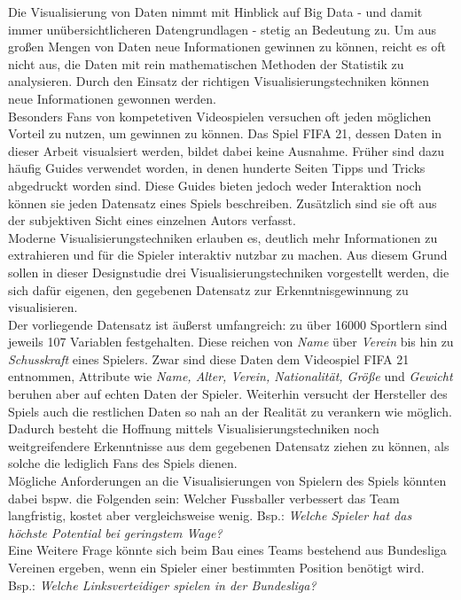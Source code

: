 \documentclass[usegeometry=true]{scrartcl}
\begin{document}
Die Visualisierung von Daten nimmt mit Hinblick auf Big Data - und damit immer unübersichtlicheren Datengrundlagen - stetig an Bedeutung zu. Um aus großen Mengen von Daten neue Informationen gewinnen zu können, reicht es oft nicht aus, die Daten mit rein mathematischen Methoden der Statistik zu analysieren. Durch den Einsatz der richtigen Visualisierungstechniken können neue Informationen gewonnen werden.\\
Besonders Fans von kompetetiven Videospielen versuchen oft jeden möglichen Vorteil zu nutzen, um gewinnen zu können.
Das Spiel FIFA 21, dessen Daten in dieser Arbeit visualsiert werden, bildet dabei keine Ausnahme.
Früher sind dazu häufig Guides verwendet worden, in denen hunderte Seiten Tipps und Tricks abgedruckt worden sind. Diese Guides bieten jedoch weder Interaktion noch können sie jeden Datensatz eines Spiels beschreiben. Zusätzlich sind sie oft aus der subjektiven Sicht eines einzelnen Autors verfasst.\\
Moderne Visualisierungstechniken erlauben es, deutlich mehr Informationen zu extrahieren und für die Spieler interaktiv nutzbar zu machen.
Aus diesem Grund sollen in dieser Designstudie drei Visualisierungstechniken vorgestellt werden, die sich dafür eigenen, den gegebenen Datensatz zur Erkenntnisgewinnung zu visualisieren.\\
Der vorliegende Datensatz ist äußerst umfangreich: zu über 16000 Sportlern sind jeweils 107 Variablen festgehalten. Diese reichen von \textit{Name} über \textit{Verein} bis hin zu \textit{Schusskraft} eines Spielers.
Zwar sind diese Daten dem Videospiel FIFA 21 entnommen, Attribute wie \textit{Name, Alter, Verein, Nationalität, Größe} und \textit{Gewicht} beruhen aber auf echten Daten der Spieler. Weiterhin versucht der Hersteller des Spiels auch die restlichen Daten so nah an der Realität zu verankern wie möglich.
Dadurch besteht die Hoffnung mittels Visualisierungstechniken noch weitgreifendere Erkenntnisse aus dem gegebenen Datensatz ziehen zu können, als solche die lediglich Fans des Spiels dienen.\\
Mögliche Anforderungen an die Visualisierungen von Spielern des Spiels könnten dabei bspw. die Folgenden sein: Welcher Fussballer verbessert das Team langfristig, kostet aber vergleichsweise wenig. Bsp.: \textit{Welche Spieler hat das höchste Potential bei geringstem Wage?}\\
Eine Weitere Frage könnte sich beim Bau eines Teams bestehend aus Bundesliga Vereinen ergeben, wenn ein Spieler einer bestimmten Position benötigt wird. Bsp.: \textit{Welche Linksverteidiger spielen in der Bundesliga?}\\
\end{document}
